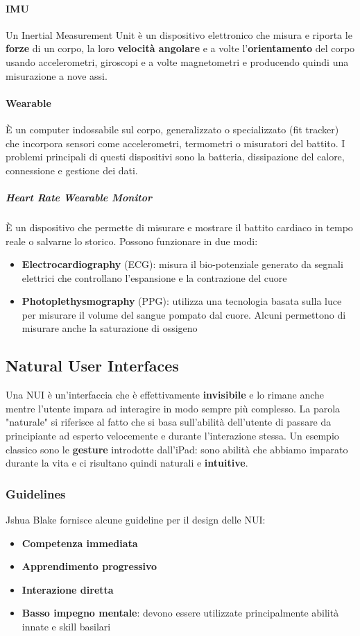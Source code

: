 \paragraph{IMU} Un Inertial Measurement Unit è un dispositivo elettronico che misura e riporta le \textbf{forze} di un corpo, la loro\textbf{ velocità angolare} e a volte l'\textbf{orientamento} del corpo usando accelerometri, giroscopi e a volte magnetometri e producendo quindi una misurazione a nove assi.

\paragraph{Wearable} È un computer indossabile sul corpo, generalizzato o specializzato (fit tracker) che incorpora sensori come accelerometri, termometri o misuratori del battito. I problemi principali di questi dispositivi sono la batteria, dissipazione del calore, connessione e gestione dei dati.

\subparagraph{Heart Rate Wearable Monitor} È un dispositivo che permette di misurare e mostrare il battito cardiaco in tempo reale o salvarne lo storico. Possono funzionare in due modi:
\begin{itemize}
	\item \textbf{Electrocardiography} (ECG): misura il bio-potenziale generato da segnali elettrici che controllano l'espansione e la contrazione del cuore
	\item \textbf{Photoplethysmography} (PPG): utilizza una tecnologia basata sulla luce per misurare il volume del sangue pompato dal cuore. Alcuni permettono di misurare anche la saturazione di ossigeno
\end{itemize}

\subsection{Natural User Interfaces}
Una NUI è un'interfaccia che è effettivamente \textbf{invisibile} e lo rimane anche mentre l'utente impara ad interagire in modo sempre più complesso. La parola "naturale" si riferisce al fatto che si basa sull'abilità dell'utente di passare da principiante ad esperto velocemente e durante l'interazione stessa. Un esempio classico sono le \textbf{gesture} introdotte dall'iPad: sono abilità che abbiamo imparato durante la vita e ci risultano quindi naturali e \textbf{intuitive}.

\subsubsection{Guidelines}
Jshua Blake fornisce alcune guideline per il design delle NUI:
\begin{itemize}
	\item \textbf{Competenza immediata}
	\item \textbf{Apprendimento progressivo}
	\item \textbf{Interazione diretta}
	\item \textbf{Basso impegno mentale}: devono essere utilizzate principalmente abilità innate e skill basilari
\end{itemize}

